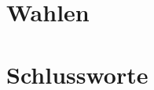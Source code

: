 \documentclass[ngerman, 10pt, openany]{scrbook}
\begin{document}
%       

\chapter{Wahlen}
  \minitoc
  

%   
%   

%   
%   
%   
%   
%   
%   
%   
%   
%   
%   
%   
%   
%   
%   
%   
%   
%   
%   
%   
%   
%   
%   
%   
%   
%   
%   
%   
%   
%   
%   
%   
%   
%   
%   
%   
%   
%   

\chapter{Schlussworte}
  
\end{document}
